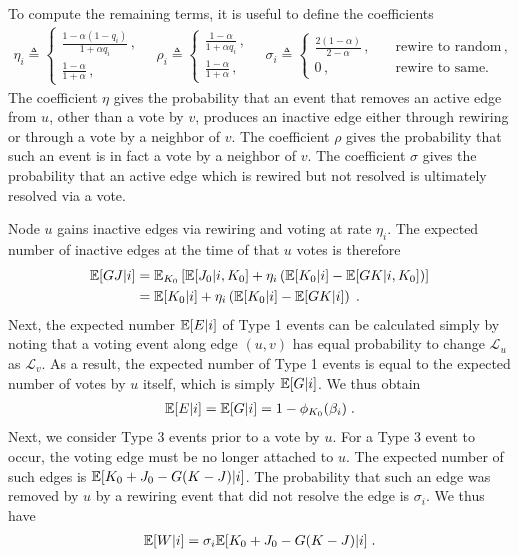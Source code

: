 \documentclass[review, onefignum, onetabnum]{siamart171218}
\begin{document}
        To compute the remaining terms, it is useful to define the coefficients 
        \begin{align*}
        \eta_i \triangleq 
        \begin{cases}
          \frac{1-\alpha(1-q_i)}{1+\alpha q_i}\,,  \\ 
          \frac{1-\alpha}{1+\alpha}\,,
        \end{cases} \quad 
        \rho_i \triangleq 
        \begin{cases}
          \frac{1-\alpha}{1+\alpha q_i}\,,  \\ 
          \frac{1-\alpha}{1+\alpha}\,,   
        \end{cases} \quad 
        \sigma_i \triangleq 
        \begin{cases}
          \frac{2(1-\alpha)}{2-\alpha}\,, &\quad \text{rewire to random}\,, \\ 
          0\,,   &\quad \text{rewire to same.}
        \end{cases} \label{eq:coefs}
        \end{align*}
        The coefficient $\eta$ gives the probability that an event that removes an active edge from $u$, other than a vote by $v$, produces an inactive edge either through rewiring or through a vote by a neighbor of $v$. The coefficient $\rho$ gives the probability that such an event is in fact a vote by a neighbor of $v$. The coefficient $\sigma$ gives the probability that an active edge which is rewired but not resolved is ultimately resolved via a vote. 
        
        Node $u$ gains inactive edges via rewiring and voting at rate $\eta_i$. 
        The expected number of inactive edges at the time of that $u$ votes is therefore 
        \begin{align*}
        \mathbb{E}[GJ|i] &= \mathbb{E}_{K_0}\left[\mathbb{E}[J_0|i, K_0] + \eta_i \left(\mathbb{E}[K_0|i] - \mathbb{E}[GK|i, K_0]\right)\right] \\
                    &= \mathbb{E}[K_0|i] + \eta_i \left(\mathbb{E}[K_0|i] - \mathbb{E}[GK|i]\right)\;.
        \end{align*}
        Next, the expected number $\mathbb{E}[E|i]$ of Type 1 events  can be calculated simply by noting that a voting event along edge $(u,v)$ has equal probability to change $\mathcal{L}_u$ as $\mathcal{L}_v$. 
        As a result, the expected number of Type 1 events is equal to the expected number of votes by $u$ itself, which is simply $\mathbb{E}[G|i]$. We thus obtain 
        \begin{align*}
        \mathbb{E}[E|i] = \mathbb{E}[G|i] = 1 - \phi_{K_0}(\beta_i)\;. 
        \end{align*}
        Next, we consider Type 3 events prior to a vote by $u$. 
        For a Type 3 event to occur, the voting edge must be no longer attached to $u$. 
        The expected number of such edges is $\mathbb{E}[K_0 + J_0 - G(K - J)|i]$. 
        The probability that such an edge was removed by $u$ by a rewiring event that did not resolve the edge is $\sigma_i$. 
        We thus have 
        \begin{align*}
            \mathbb{E}[W|i] = \sigma_i\mathbb{E}[K_0 + J_0 - G(K - J)|i]\;.
        \end{align*}
        
\end{document}
